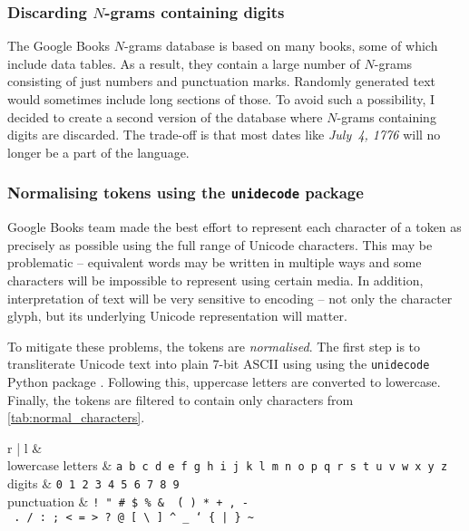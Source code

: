 \documentclass[draft]{IIBproject}
\begin{document}
\subsubsection{Discarding $N$-grams containing digits}

The Google Books $N$-grams database is based on many books, some of which include data tables. As a result, they contain a large number of $N$-grams consisting of just numbers and punctuation marks. Randomly generated text would sometimes include long sections of those. To avoid such a possibility, I decided to create a second version of the database where $N$-grams containing digits are discarded. The trade-off is that most dates like \emph{July~4, 1776} will no longer be a part of the language.

\subsubsection{Normalising tokens using the \texttt{unidecode} package}

Google Books team made the best effort to represent each character of a token as precisely as possible using the full range of Unicode characters. This may be problematic -- equivalent words may be written in multiple ways and some characters will be impossible to represent using certain media. In addition, interpretation of text will be very sensitive to encoding -- not only the character glyph, but its underlying Unicode representation will matter.

To mitigate these problems, the tokens are \emph{normalised}. The first step is to transliterate Unicode text into plain 7-bit ASCII using using the \texttt{unidecode} Python package \cite{lib:unidecode}. Following this, uppercase letters are converted to lowercase. Finally, the tokens are filtered to contain only characters from \cref{tab:normal_characters}.

\begin{table}[h]
	\centering
	\begin{tabular}{r | l}
	 &  \\
	\hline
	lowercase letters & \texttt{\footnotesize a b c d e f g h i j k l m n o p q r s t u v w x y z} \\
	digits & \texttt{\footnotesize 0 1 2 3 4 5 6 7 8 9} \\
	punctuation & \texttt{\footnotesize !\ "\ \#\ \$\ \%\ \&\ \'\ (\ )\ *\ +\ ,\ -\ .\ /\ :\ ;\ <\ =\ >\ ?\ @\ [\ \textbackslash\ ]\ \textasciicircum\ \_\ `\ \{\ |\ \}\ \textasciitilde}
	\end{tabular}
	\caption{\label{tab:normal_characters}Characters that can be a part of a normalised token.}
\end{table}
\end{document}

